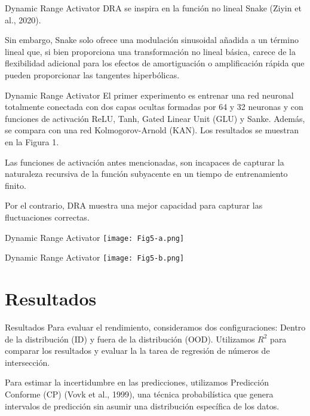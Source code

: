 \documentclass{beamer}
\begin{document}
\begin{frame}{Dynamic Range Activator}
    DRA se inspira en la función no lineal Snake (Ziyin et al., 2020). 
    \newline
    \pause
    
    Sin embargo, Snake solo ofrece una modulación sinusoidal añadida a un término lineal que, si bien proporciona una transformación no lineal básica, carece de la flexibilidad adicional para los efectos de amortiguación o amplificación rápida que pueden proporcionar las tangentes hiperbólicas.
\end{frame}

\begin{frame}{Dynamic Range Activator}
    El primer experimento es entrenar una red neuronal totalmente conectada con dos capas ocultas formadas por 64 y 32 neuronas y con funciones de activación ReLU, Tanh, Gated Linear Unit (GLU) y Sanke. Además, se compara con una red Kolmogorov-Arnold (KAN). Los resultados se muestran en la Figura 1.
    \newline
    \pause

    Las funciones de activación antes mencionadas, son incapaces de capturar la naturaleza recursiva de la función subyacente en un tiempo de entrenamiento finito.
    \newline
    \pause

    Por el contrario, DRA muestra una mejor capacidad para capturar las fluctuaciones correctas.
\end{frame}

\begin{frame}{Dynamic Range Activator}
     \texttt{[image: Fig5-a.png]}
\end{frame}

\begin{frame}{Dynamic Range Activator}
     \texttt{[image: Fig5-b.png]}
\end{frame}

\section{Resultados}
\begin{frame}{Resultados}
    Para evaluar el rendimiento, consideramos dos configuraciones: Dentro de la distribución (ID) y fuera de la distribución (OOD).
    Utilizamos $R^{2}$ para comparar los resultados y evaluar la la tarea de regresión de números de intersección.
    \newline
    \pause

    Para estimar la incertidumbre en las predicciones, utilizamos Predicción Conforme (CP) (Vovk et al., 1999), una técnica probabilística que genera intervalos de predicción sin asumir una distribución específica de los datos. 
\end{frame}
\end{document}

